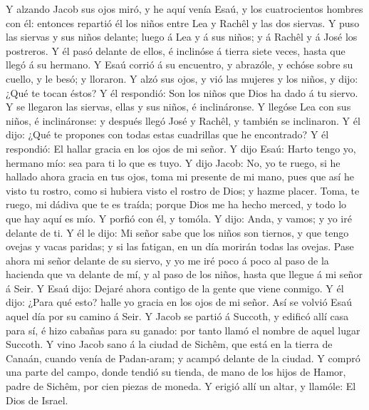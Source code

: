  Y alzando Jacob sus ojos miró, y he aquí venía Esaú, y
los cuatrocientos hombres con él: entonces repartió él los niños entre
Lea y Rachêl y las dos siervas.  Y puso las siervas y sus
niños delante; luego á Lea y á sus niños; y á Rachêl y á José los
postreros.  Y él pasó delante de ellos, é inclinóse á
tierra siete veces, hasta que llegó á su hermano.  Y Esaú
corrió á su encuentro, y abrazóle, y echóse sobre su cuello, y le besó;
y lloraron.  Y alzó sus ojos, y vió las mujeres y los
niños, y dijo: ¿Qué te tocan éstos? Y él respondió: Son los niños que
Dios ha dado á tu siervo.  Y se llegaron las siervas,
ellas y sus niños, é inclináronse.  Y llegóse Lea con sus
niños, é inclináronse: y después llegó José y Rachêl, y también se
inclinaron.  Y él dijo: ¿Qué te propones con todas estas
cuadrillas que he encontrado? Y él respondió: El hallar gracia en los
ojos de mi señor.  Y dijo Esaú: Harto tengo yo, hermano
mío: sea para ti lo que es tuyo.  Y dijo Jacob: No, yo te
ruego, si he hallado ahora gracia en tus ojos, toma mi presente de mi
mano, pues que así he visto tu rostro, como si hubiera visto el rostro
de Dios; y hazme placer.  Toma, te ruego, mi dádiva que
te es traída; porque Dios me ha hecho merced, y todo lo que hay aquí es
mío. Y porfió con él, y tomóla.  Y dijo: Anda, y vamos; y
yo iré delante de ti.  Y él le dijo: Mi señor sabe que
los niños son tiernos, y que tengo ovejas y vacas paridas; y si las
fatigan, en un día morirán todas las ovejas.  Pase ahora
mi señor delante de su siervo, y yo me iré poco á poco al paso de la
hacienda que va delante de mí, y al paso de los niños, hasta que llegue
á mi señor á Seir.  Y Esaú dijo: Dejaré ahora contigo de
la gente que viene conmigo. Y él dijo: ¿Para qué esto? halle yo gracia
en los ojos de mi señor.  Así se volvió Esaú aquel día
por su camino á Seir.  Y Jacob se partió á Succoth, y
edificó allí casa para sí, é hizo cabañas para su ganado: por tanto
llamó el nombre de aquel lugar Succoth.  Y vino Jacob
sano á la ciudad de Sichêm, que está en la tierra de Canaán, cuando
venía de Padan-aram; y acampó delante de la ciudad.  Y
compró una parte del campo, donde tendió su tienda, de mano de los hijos
de Hamor, padre de Sichêm, por cien piezas de moneda.  Y
erigió allí un altar, y llamóle: El Dios de Israel.

